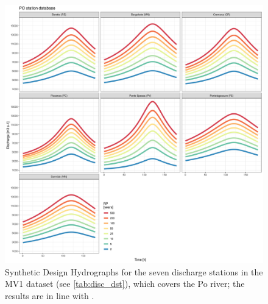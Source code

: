 \begin{figure}
    \centering
    \includegraphics[width=\textwidth]{figures/valid_flood/method/po_sdh}
    \decoRule
    \caption[Synthetic Design Hydrographs for stations in the MV1 dataset]{Synthetic Design Hydrographs for the seven discharge stations in the MV1 dataset (see \cref{tab:disc_dst}), which covers the Po river; the results are in line with \citet{Maione2003}.}
    \label{fig:po_sdh}
\end{figure}


